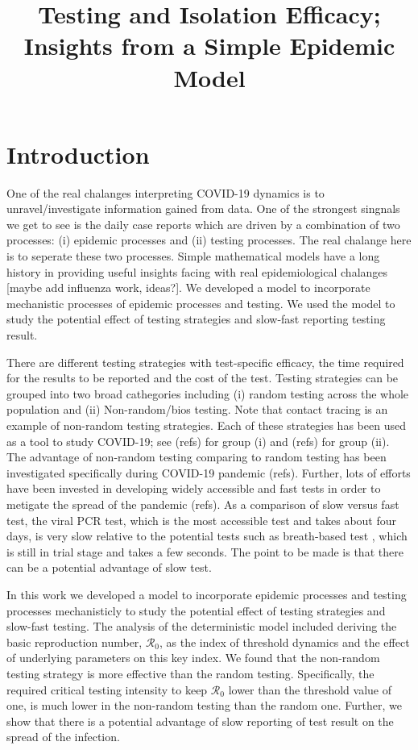 \documentclass{article}
\title{Testing and Isolation Efficacy; Insights from a Simple Epidemic Model }
\newcommand{\Rnum}{\mathcal{R}_0}
\theoremstyle{definition} %
\begin{document}
\maketitle

\section{Introduction}

One of the real chalanges interpreting COVID-19 dynamics is to unravel/investigate information gained from data. One of the strongest singnals we get to see is the daily case reports which are driven by a combination of two processes: (i) epidemic processes and (ii) testing processes. The real chalange here is to seperate these two processes. Simple mathematical models have a long history in providing useful insights facing with real epidemiological chalanges \citep{ross1911prevention} [maybe add influenza work, ideas?]. We developed a model to incorporate mechanistic processes of epidemic processes and testing. We used the model to study the potential effect of testing strategies and slow-fast reporting testing result. 

There are different testing strategies with test-specific efficacy, the time required for the results to be reported and the cost of the test. Testing strategies can be grouped into two broad cathegories including (i) random testing across the whole population and (ii) Non-random/bios testing. Note that contact tracing is an example of non-random testing strategies. Each of these strategies has been used as a tool to study COVID-19; see (refs) for group (i) and (refs) for group (ii). The advantage of non-random testing comparing to random testing has been investigated specifically during COVID-19 pandemic (refs). Further, lots of efforts have been invested in developing widely accessible and fast tests in order to metigate the spread of the pandemic (refs). As a comparison of slow versus fast test, the viral PCR test, which is the most accessible test and takes about four days, is very slow relative to the potential tests such as breath-based test \citep{ruszkiewicz2020diagnosis}, which is still in trial stage and takes a few seconds. The point to be made is that there can be a potential advantage of slow test.

In this work we developed a model to incorporate epidemic processes and testing processes mechanisticly to study the potential effect of testing strategies and slow-fast testing. The analysis of the deterministic model included deriving the basic reproduction number, $\Rnum$, as the index of threshold dynamics and the effect of underlying parameters on this key index. We found that the non-random testing strategy is more effective than the random testing. Specifically, the required critical testing intensity to keep $\Rnum$ lower than the threshold value of one, is much lower in the non-random testing than the random one. Further, we show that there is a potential advantage of slow reporting of test result on the spread of the infection.  
\end{document}
